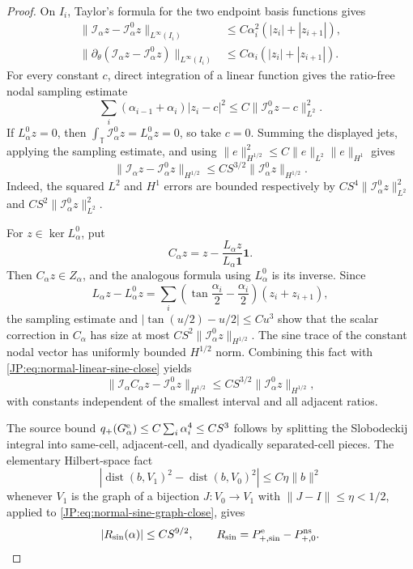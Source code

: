 \begin{proof}
On $I_i$, Taylor's formula for the two endpoint basis functions gives
\begin{align*}
 \|\mathcal I_\alpha z-\mathcal I_\alpha^0z\|_{L^\infty(I_i)}
 &\le C\alpha_i^2(|z_i|+|z_{i+1}|),\\
 \|\partial_\theta(\mathcal I_\alpha z-\mathcal I_\alpha^0z)
        \|_{L^\infty(I_i)}
 &\le C\alpha_i(|z_i|+|z_{i+1}|).
\end{align*}
For every constant $c$, direct integration of a linear function gives the
ratio-free nodal sampling estimate
\[
 \sum_i(\alpha_{i-1}+\alpha_i)|z_i-c|^2
 \le C\|\mathcal I_\alpha^0z-c\|_{L^2}^2.
\]
If $L_\alpha^0z=0$, then
$\int_{\mathbb T}\mathcal I_\alpha^0z=L_\alpha^0z=0$, so take $c=0$.
Summing the displayed jets, applying the sampling estimate, and using
$\|e\|_{H^{1/2}}^2\le C\|e\|_{L^2}\|e\|_{H^1}$ gives
\begin{equation}\label{JP:eq:normal-linear-sine-close}
 \|\mathcal I_\alpha z-\mathcal I_\alpha^0z\|_{H^{1/2}}
 \le CS^{3/2}\|\mathcal I_\alpha^0z\|_{H^{1/2}}.
\end{equation}
Indeed, the squared $L^2$ and $H^1$ errors are bounded respectively by
$CS^4\|\mathcal I_\alpha^0z\|_{L^2}^2$ and
$CS^2\|\mathcal I_\alpha^0z\|_{L^2}^2$.

For $z\in\ker L_\alpha^0$, put
\[
 C_\alpha z=z-\frac{L_\alpha z}{L_\alpha\mathbf1}\mathbf1.
\]
Then $C_\alpha z\in Z_\alpha$, and the analogous formula using
$L_\alpha^0$ is its inverse.  Since
\[
 L_\alpha z-L_\alpha^0z
 =\sum_i\left(\tan\frac{\alpha_i}{2}-\frac{\alpha_i}{2}\right)
       (z_i+z_{i+1}),
\]
the sampling estimate and
$|\tan(u/2)-u/2|\le Cu^3$ show that the scalar correction in $C_\alpha$
has size at most $CS^2\|\mathcal I_\alpha^0z\|_{H^{1/2}}$.
The sine trace of the constant nodal vector has uniformly bounded
$H^{1/2}$ norm.  Combining this fact with
\eqref{JP:eq:normal-linear-sine-close} yields
\begin{equation}\label{JP:eq:normal-sine-graph-close}
 \|\mathcal I_\alpha C_\alpha z-\mathcal I_\alpha^0z\|_{H^{1/2}}
 \le CS^{3/2}\|\mathcal I_\alpha^0z\|_{H^{1/2}},
\end{equation}
with constants independent of the smallest interval and all adjacent
ratios.

The source bound
$q_+(G_\alpha^{\rm e})\le C\sum_i\alpha_i^4\le CS^3$
follows by splitting the Slobodeckij integral into same-cell,
adjacent-cell, and dyadically separated-cell pieces.  The elementary
Hilbert-space fact
\[
 \left|\operatorname {dist}(b,V_1)^2
       -\operatorname {dist}(b,V_0)^2\right|
 \le C\eta\|b\|^2
\]
whenever $V_1$ is the graph of a bijection $J:V_0\to V_1$ with
$\|J-I\|\le\eta<1/2$, applied to
\eqref{JP:eq:normal-sine-graph-close}, gives
\begin{equation}\label{JP:eq:normal-sine-absolute}
 |R_{\sin}(\alpha)|\le CS^{9/2},
 \qquad R_{\sin}=P_{+,\sin}^{\rm e}-P_{+,0}^{\rm ns}.
\end{equation}


\end{proof}
